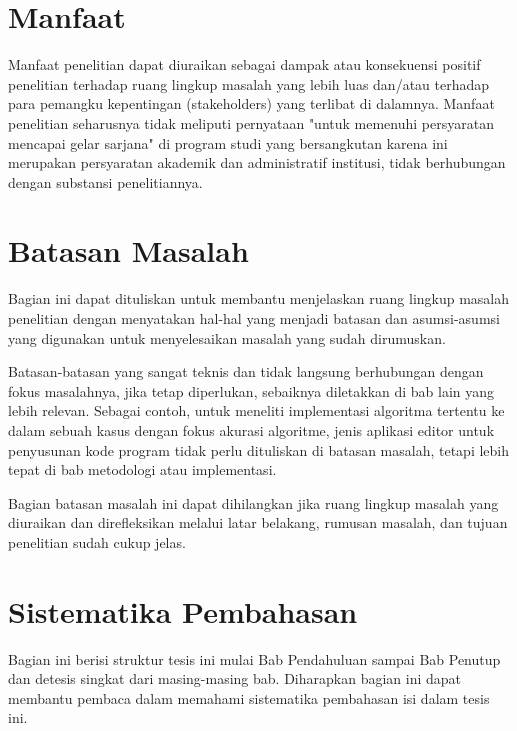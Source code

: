 \section{Manfaat}

Manfaat penelitian dapat diuraikan sebagai dampak atau konsekuensi positif penelitian terhadap ruang lingkup masalah yang lebih luas dan/atau terhadap para pemangku kepentingan (stakeholders) yang terlibat di dalamnya. Manfaat penelitian seharusnya tidak meliputi pernyataan "untuk memenuhi persyaratan mencapai gelar sarjana" di program studi yang bersangkutan karena ini merupakan persyaratan akademik dan administratif  institusi, tidak berhubungan dengan substansi penelitiannya.

\section{Batasan Masalah}

Bagian ini dapat dituliskan untuk membantu menjelaskan ruang lingkup masalah penelitian dengan menyatakan hal-hal yang menjadi batasan dan asumsi-asumsi yang digunakan untuk menyelesaikan masalah yang sudah dirumuskan. 

Batasan-batasan yang sangat teknis dan tidak langsung berhubungan dengan fokus masalahnya, jika tetap diperlukan, sebaiknya diletakkan di bab lain yang lebih relevan. Sebagai contoh, untuk meneliti implementasi algoritma tertentu ke dalam sebuah kasus dengan fokus akurasi algoritme, jenis aplikasi editor untuk penyusunan kode program tidak perlu dituliskan di batasan masalah, tetapi lebih tepat di bab metodologi atau implementasi.   

Bagian batasan masalah ini dapat dihilangkan jika ruang lingkup masalah yang diuraikan dan direfleksikan melalui latar belakang, rumusan masalah, dan tujuan penelitian sudah cukup jelas.

\section{Sistematika Pembahasan}

Bagian ini berisi struktur tesis ini mulai Bab Pendahuluan sampai Bab Penutup dan detesis singkat dari masing-masing bab. Diharapkan bagian ini dapat membantu pembaca dalam memahami sistematika pembahasan isi dalam tesis ini. 